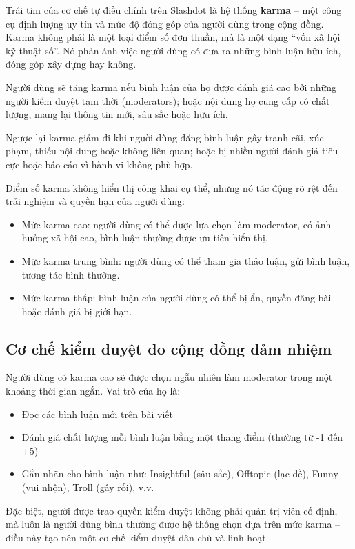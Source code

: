 Trái tim của cơ chế tự điều chỉnh trên Slashdot là hệ thống \textbf{karma} \cite{mechanisms-of-website-slashdot} -- một công cụ định lượng uy tín và mức độ đóng góp của người dùng trong cộng đồng.
Karma không phải là một loại điểm số đơn thuần, mà là một dạng ``vốn xã hội kỹ thuật số''. Nó phản ánh việc người dùng có đưa ra những bình luận hữu ích, đóng góp xây dựng hay không.

Người dùng sẽ tăng karma nếu bình luận của họ được đánh giá cao bởi những người kiểm duyệt tạm thời (moderators); hoặc nội dung họ cung cấp có chất lượng, mang lại thông tin mới, sâu sắc hoặc hữu ích.

Ngược lại karma giảm đi khi người dùng đăng bình luận gây tranh cãi, xúc phạm, thiếu nội dung hoặc không liên quan; hoặc bị nhiều người đánh giá tiêu cực hoặc báo cáo vì hành vi không phù hợp.

Điểm số karma không hiển thị công khai cụ thể, nhưng nó tác động rõ rệt đến trải nghiệm và quyền hạn của người dùng:
\begin{itemize}
  \item Mức karma cao: người dùng có thể được lựa chọn làm moderator, có ảnh hưởng xã hội cao, bình luận thường được ưu tiên hiển thị.
  \item Mức karma trung bình: người dùng có thể tham gia thảo luận, gửi bình luận, tương tác bình thường.
  \item Mức karma thấp: bình luận của người dùng có thể bị ẩn, quyền đăng bài hoặc đánh giá bị giới hạn.
\end{itemize}

\subsection{Cơ chế kiểm duyệt do cộng đồng đảm nhiệm}

Người dùng có karma cao sẽ được chọn ngẫu nhiên làm moderator trong một khoảng thời gian ngắn. Vai trò của họ là:
\begin{itemize}
  \item Đọc các bình luận mới trên bài viết
  \item Đánh giá chất lượng mỗi bình luận bằng một thang điểm (thường từ -1 đến +5)
  \item Gắn nhãn cho bình luận như: Insightful (sâu sắc), Offtopic (lạc đề), Funny (vui nhộn), Troll (gây rối), v.v.
\end{itemize}

Đặc biệt, người được trao quyền kiểm duyệt không phải quản trị viên cố định, mà luôn là người dùng bình thường được hệ thống chọn dựa trên mức karma --
điều này tạo nên một cơ chế kiểm duyệt dân chủ và linh hoạt.

